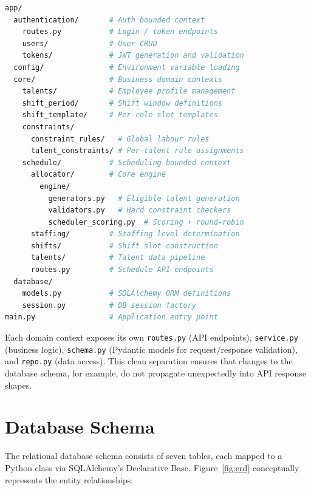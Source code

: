 \begin{lstlisting}[language=bash, style=pythonstyle, caption={Top-level project directory structure}, label={lst:dir}]
app/
  authentication/       # Auth bounded context
    routes.py           # Login / token endpoints
    users/              # User CRUD
    tokens/             # JWT generation and validation
  config/               # Environment variable loading
  core/                 # Business domain contexts
    talents/            # Employee profile management
    shift_period/       # Shift window definitions
    shift_template/     # Per-role slot templates
    constraints/
      constraint_rules/   # Global labour rules
      talent_constraints/ # Per-talent rule assignments
    schedule/           # Scheduling bounded context
      allocator/        # Core engine
        engine/
          generators.py   # Eligible talent generation
          validators.py   # Hard constraint checkers
          scheduler_scoring.py  # Scoring + round-robin
      staffing/         # Staffing level determination
      shifts/           # Shift slot construction
      talents/          # Talent data pipeline
      routes.py         # Schedule API endpoints
  database/
    models.py           # SQLAlchemy ORM definitions
    session.py          # DB session factory
main.py                 # Application entry point
\end{lstlisting}

Each domain context exposes its own \texttt{routes.py} (API endpoints), \texttt{service.py} (business logic), \texttt{schema.py} (Pydantic models for request/response validation), and \texttt{repo.py} (data access). This clean separation ensures that changes to the database schema, for example, do not propagate unexpectedly into API response shapes.

\section{Database Schema}

The relational database schema consists of seven tables, each mapped to a Python class via SQLAlchemy's Declarative Base. Figure~\ref{fig:erd} conceptually represents the entity relationships.

